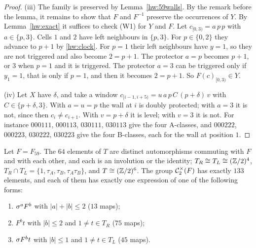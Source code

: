 \begin{proof}
(iii) The family is preserved by Lemma~\ref{hw:59walls}. By the remark before the lemma, it remains to show that $F$ and $F^{-1}$ preserve the occurrences of $Y$. By Lemma~\ref{hw:exact} it suffices to check (W1) for $Y$ and $F$. Let $c_{[0,3)}=a\,p\,p$ with $a\in\{p,3\}$. Cells $1$ and $2$ have left neighbours in $\{p,3\}$. For $p\in\{0,2\}$ they advance to $p+1$ by \eqref{hw:clock}. For $p=1$ their left neighbours have $y=1$, so they are not triggered and also become $2=p+1$. The protector $a=p$ becomes $p+1$, or $3$ when $p=1$ and it is triggered. The protector $a=3$ can be triggered only if $y_1=1$, that is only if $p=1$, and then it becomes $2=p+1$. So $F(c)_{[0,3)}\in Y$.

(iv) Let $X$ have $\delta$, and take a window $c_{[i-1,i+5)}=u\,a\,p\,C\,(p+\delta)\,v$ with $C\in\{p+\delta,3\}$. With $a=u=p$ the wall at $i$ is doubly protected; with $a=3$ it is not, since then $c_i\ne c_{i+1}$. With $v=p+\delta$ it is level; with $v=3$ it is not. For instance $000111$, $000113$, $030111$, $030113$ give the four A-classes, and $000222$, $000223$, $030222$, $030223$ give the four B-classes, each for the wall at position $1$.
\end{proof}

\begin{proposition}\label{hw:census}
Let $F=F_{59}$. The $64$ elements of $T$ are distinct automorphisms commuting with $F$ and with each other, and each is an involution or the identity; $T_R\cong T_L\cong(\mathbb{Z}/2)^4$, $T_R\cap T_L=\{1,\tau_A,\tau_B,\tau_A\tau_B\}$, and $T\cong(\mathbb{Z}/2)^6$. The group $\mathcal{C}^{\times}_2(F)$ has exactly $133$ elements, and each of them has exactly one expression of one of the following forms:
\begin{enumerate}
\item[(i)] $\sigma^aF^b$ with $|a|+|b|\le2$ ($13$ maps);
\item[(ii)] $F^bt$ with $|b|\le2$ and $1\ne t\in T_R$ ($75$ maps);
\item[(iii)] $\sigma F^bt$ with $|b|\le1$ and $1\ne t\in T_L$ ($45$ maps).
\end{enumerate}
\end{proposition}

